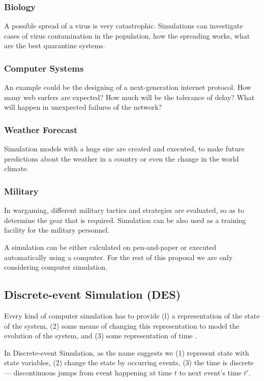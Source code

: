 \documentclass[a4paper]{article}
\begin{document}
\subsubsection{Biology}

A possible spread of a virus is very catastrophic. Simulations can investigate
cases of virus contamination in the population, how the spreading works,
what are the best quarantine systems.

\subsubsection{Computer Systems}

An example could be the designing of a next-generation internet protocol.
How many web surfers are expected? How much will be the tolerance of delay? What
will happen in unexpected failures of the network?

\subsubsection{Weather Forecast}

Simulation models with a huge size are created and executed, to make future predictions 
about the weather in a country or even the change in the world climate.


\subsubsection{Military}

In wargaming, different military tactics and strategies are evaluated, so
as to determine the gear that is required. Simulation
can be also used as a training facility for the military personnel.


A simulation can be either calculated on pen-and-paper or executed automatically
using a computer. For the rest of this proposal we are only considering computer simulation.

\subsection{Discrete-event Simulation (DES)}

Every kind of computer simulation has to 
provide  (l) a representation of the state of the system, (2) some means of
changing this representation to model the evolution of the system, and (3)
some representation of time \cite{fujimoto_parallel_2001}.

In Discrete-event Simulation, as the name suggests we (1) represent
state with state variables, (2) change the state by occurring events,
(3) the time is discrete --- discontinuous jumps from event happening at time $t$ to next event's
time $t'$.
\end{document}
